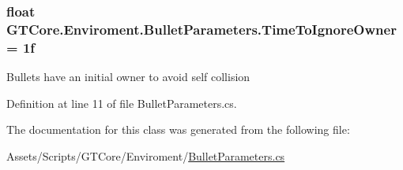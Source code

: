 \subsubsection[{Time\+To\+Ignore\+Owner}]{\setlength{\rightskip}{0pt plus 5cm}float G\+T\+Core.\+Enviroment.\+Bullet\+Parameters.\+Time\+To\+Ignore\+Owner = 1f}\label{class_g_t_core_1_1_enviroment_1_1_bullet_parameters_a72dde58036092d5d43a50640f31e84b4}


Bullets have an initial owner to avoid self collision 



Definition at line 11 of file Bullet\+Parameters.\+cs.



The documentation for this class was generated from the following file\+:\begin{DoxyCompactItemize}
\item 
Assets/\+Scripts/\+G\+T\+Core/\+Enviroment/\hyperlink{_bullet_parameters_8cs}{Bullet\+Parameters.\+cs}\end{DoxyCompactItemize}
